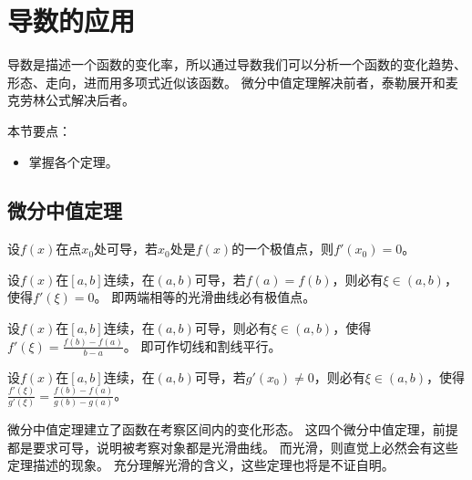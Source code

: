 \section{导数的应用}

导数是描述一个函数的变化率，所以通过导数我们可以分析一个函数的变化趋势、形态、走向，进而用多项式近似该函数。
微分中值定理解决前者，泰勒展开和麦克劳林公式解决后者。

本节要点：
\begin{itemize}
    \item 掌握各个定理。
\end{itemize}

\subsection{微分中值定理}

\begin{theorem}[费马定理]
设$f\left( x \right) $在点$x_0$处可导，若$x_0$处是$f\left( x \right) $的一个极值点，则$f'\left( x_0 \right) =0$。
\end{theorem}

\begin{theorem}[罗尔定理]
设$f\left( x \right) $在$\left[ a,b \right] $连续，在$\left( a,b \right) $可导，若$f\left( a \right) =f\left( b \right) $，则必有$\xi \in \left( a,b \right) $，使得$f'\left( \xi \right) =0$。
即两端相等的光滑曲线必有极值点。
\end{theorem}

\begin{theorem}[拉格朗日定理]
设$f\left( x \right) $在$\left[ a,b \right] $连续，在$\left( a,b \right) $可导，则必有$\xi \in \left( a,b \right) $，使得$f'\left( \xi \right) =\frac{f\left( b \right) -f\left( a \right)}{b-a}$。
即可作切线和割线平行。
\end{theorem}

\begin{theorem}[柯西定理]
设$f\left( x \right) $在$\left[ a,b \right] $连续，在$\left( a,b \right) $可导，若$g'\left( x_0 \right) \ne 0$，则必有$\xi \in \left( a,b \right) $，使得$\frac{f'\left( \xi \right)}{g'\left( \xi \right)}=\frac{f\left( b \right) -f\left( a \right)}{g\left( b \right) -g\left( a \right)}$。
\end{theorem}

微分中值定理建立了函数在考察区间内的变化形态。
这四个微分中值定理，前提都是要求可导，说明被考察对象都是光滑曲线。
而光滑，则直觉上必然会有这些定理描述的现象。
充分理解光滑的含义，这些定理也将是不证自明。

